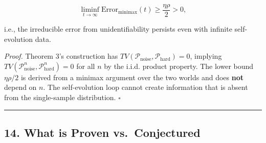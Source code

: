 \documentclass[
  12pt,
]{article}
\begin{document}
\[\liminf_{t\to\infty} \text{Error}_{\text{minimax}}(t) \geq \frac{\eta\rho}{2} > 0,\]

i.e., the irreducible error from unidentifiability persists even with
infinite self-evolution data.

\emph{Proof.} Theorem 3's construction has
\(TV(\mathcal{P}_{\text{noise}}, \mathcal{P}_{\text{hard}}) = 0\),
implying
\(TV(\mathcal{P}_{\text{noise}}^n, \mathcal{P}_{\text{hard}}^n) = 0\)
for all \(n\) by the i.i.d. product property. The lower bound
\(\eta\rho/2\) is derived from a minimax argument over the two worlds
and does \textbf{not} depend on \(n\). The self-evolution loop cannot
create information that is absent from the single-sample distribution.
\(\square\)

\begin{center}\rule{0.5\linewidth}{0.5pt}\end{center}

\subsection{14. What is Proven
vs.~Conjectured}\label{what-is-proven-vs.-conjectured}
\end{document}
